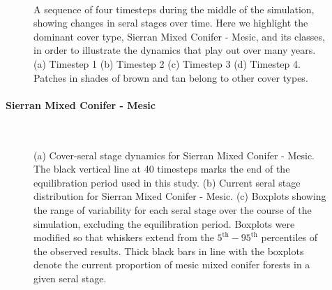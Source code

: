 \begin{figure}[!htbp]
  \centering
  \\%
  \caption{A sequence of four timesteps during the middle of the simulation, showing changes in seral stages over time. Here we highlight the dominant cover type, Sierran Mixed Conifer - Mesic, and its classes, in order to illustrate the dynamics that play out over many years. (a) Timestep 1 (b) Timestep 2 (c) Timestep 3 (d) Timestep 4. Patches in shades of brown and tan belong to other cover types.}
  \label{fig:covcondmaps}
\end{figure}


\clearpage

\paragraph{Sierran Mixed Conifer - Mesic}

\begin{figure}[!htbp]
  \centering
   \\
  \caption{(a) Cover-seral stage dynamics for Sierran Mixed Conifer - Mesic. The black vertical line at 40 timesteps marks the end of the equilibration period used in this study. (b) Current seral stage distribution for Sierran Mixed Conifer - Mesic. (c) Boxplots showing the range of variability for each seral stage over the course of the simulation, excluding the equilibration period. Boxplots were modified so that whiskers extend from the $5^{\text{th}} - 95^{\text{th}}$ percentiles of the observed results. Thick black bars in line with the boxplots denote the current proportion of mesic mixed conifer forests in a given seral stage.} 
  \label{fig:hrv-covcond_smcm}
\end{figure}

